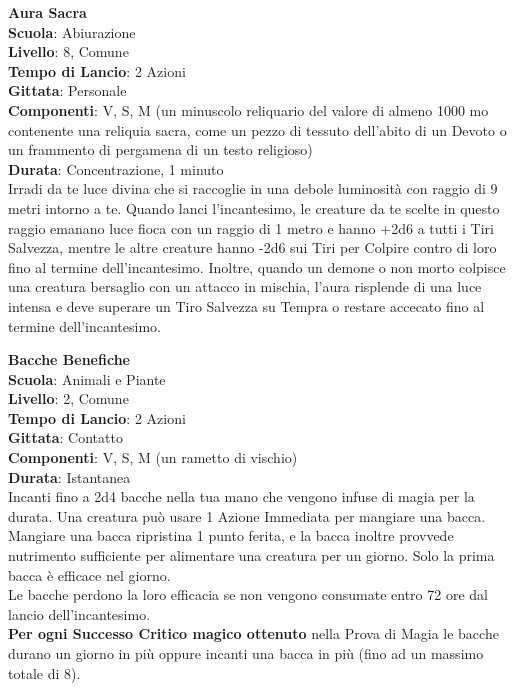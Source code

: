 \begin{multicols}{2}
\medskip\textbf{Aura Sacra}\\
\textbf{Scuola}: Abiurazione\\
\textbf{Livello}: 8, Comune\\
\textbf{Tempo di Lancio}: 2 Azioni\\
\textbf{Gittata}: Personale\\
\textbf{Componenti}: V, S, M (un minuscolo reliquario del valore di almeno 1000 mo contenente una reliquia sacra, come un pezzo di tessuto dell'abito di un Devoto o un frammento di pergamena di un testo religioso)\\
\textbf{Durata}: Concentrazione, 1 minuto\\
Irradi da te luce divina che si raccoglie in una debole luminosità con raggio di 9 metri intorno a te. Quando lanci l'incantesimo, le creature da te scelte in questo raggio emanano luce fioca con un raggio di 1 metro e hanno {+2d6} a tutti i Tiri Salvezza, mentre le altre creature hanno {-2d6} sui Tiri per Colpire contro di loro fino al termine dell'incantesimo. Inoltre, quando un demone o non morto colpisce una creatura bersaglio con un attacco in mischia, l'aura risplende di una luce intensa e deve superare un Tiro Salvezza su Tempra o restare accecato fino al termine dell'incantesimo.

\medskip\textbf{Bacche Benefiche}\\
\textbf{Scuola}: Animali e Piante\\
\textbf{Livello}: 2, Comune\\
\textbf{Tempo di Lancio}: 2 Azioni\\
\textbf{Gittata}: Contatto\\
\textbf{Componenti}: V, S, M (un rametto di vischio)\\
\textbf{Durata}: Istantanea\\
Incanti fino a 2d4 bacche nella tua mano che vengono infuse di magia per la durata. Una creatura può usare 1 Azione Immediata per mangiare una bacca. Mangiare una bacca ripristina 1 punto ferita, e la bacca inoltre provvede nutrimento sufficiente per alimentare una creatura per un giorno. Solo la prima bacca è efficace nel giorno.\\
Le bacche perdono la loro efficacia se non vengono consumate entro 72 ore dal lancio dell'incantesimo. \\
\textbf{Per ogni Successo Critico magico ottenuto} nella Prova di Magia le bacche durano un giorno in più oppure incanti una bacca in più (fino ad un massimo totale di 8).


\end{multicols}
